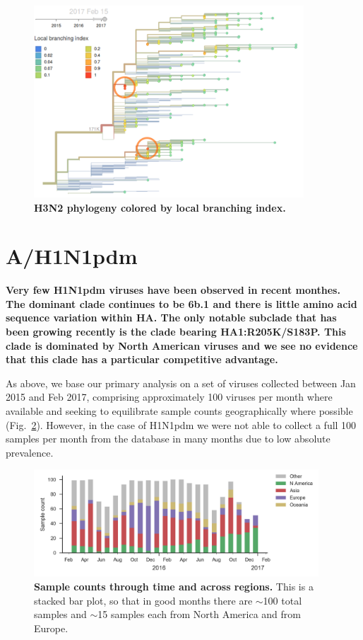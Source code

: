 \documentclass[11pt,oneside,letterpaper]{article}
\begin{document}
\begin{figure}[H]
	\centering
	\includegraphics[width=0.9\textwidth]{../figures/feb-2017/h3n2_lbi.png}
	\caption{\textbf{H3N2 phylogeny colored by local branching index.}
	}
	\label{H3N2_lbi}
\end{figure}

\clearpage
\pagebreak

\section*{A/H1N1pdm}

\textbf{Very few H1N1pdm viruses have been observed in recent monthes.
The dominant clade continues to be 6b.1 and there is little amino acid sequence variation within HA.
The only notable subclade that has been growing recently is the clade bearing HA1:R205K/S183P.
This clade is dominated by North American viruses and we see no evidence that this clade has a particular competitive advantage.}

As above, we base our primary analysis on a set of viruses collected between Jan 2015 and Feb 2017, comprising approximately 100 viruses per month where available and seeking to equilibrate sample counts geographically where possible (Fig.\ \ref{H1N1pdm_counts}). However, in the case of H1N1pdm we were not able to collect a full 100 samples per month from the database in many months due to low absolute prevalence.

\begin{figure}[H]
	\centering
	\includegraphics[width=0.95\textwidth]{../figures/feb-2017/H1N1pdm_counts.png}
	\caption{\textbf{Sample counts through time and across regions.}
	This is a stacked bar plot, so that in good months there are $\sim$100 total samples and $\sim$15 samples each from North America and from Europe.
	}
	\label{H1N1pdm_counts}
\end{figure}
\end{document}
